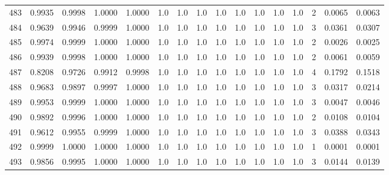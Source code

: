 \begin{tabular}{lrrrrrrrrrrrrrrr}
483 &      0.9935 &  0.9998 &  1.0000 &  1.0000 &     1.0 &     1.0 &     1.0 &     1.0 &     1.0 &     1.0 &      1.0 &        1.0 &      2 &                    0.0065 &                     0.0063 \\
484 &      0.9639 &  0.9946 &  0.9999 &  1.0000 &     1.0 &     1.0 &     1.0 &     1.0 &     1.0 &     1.0 &      1.0 &        1.0 &      3 &                    0.0361 &                     0.0307 \\
485 &      0.9974 &  0.9999 &  1.0000 &  1.0000 &     1.0 &     1.0 &     1.0 &     1.0 &     1.0 &     1.0 &      1.0 &        1.0 &      2 &                    0.0026 &                     0.0025 \\
486 &      0.9939 &  0.9998 &  1.0000 &  1.0000 &     1.0 &     1.0 &     1.0 &     1.0 &     1.0 &     1.0 &      1.0 &        1.0 &      2 &                    0.0061 &                     0.0059 \\
487 &      0.8208 &  0.9726 &  0.9912 &  0.9998 &     1.0 &     1.0 &     1.0 &     1.0 &     1.0 &     1.0 &      1.0 &        1.0 &      4 &                    0.1792 &                     0.1518 \\
488 &      0.9683 &  0.9897 &  0.9997 &  1.0000 &     1.0 &     1.0 &     1.0 &     1.0 &     1.0 &     1.0 &      1.0 &        1.0 &      3 &                    0.0317 &                     0.0214 \\
489 &      0.9953 &  0.9999 &  1.0000 &  1.0000 &     1.0 &     1.0 &     1.0 &     1.0 &     1.0 &     1.0 &      1.0 &        1.0 &      3 &                    0.0047 &                     0.0046 \\
490 &      0.9892 &  0.9996 &  1.0000 &  1.0000 &     1.0 &     1.0 &     1.0 &     1.0 &     1.0 &     1.0 &      1.0 &        1.0 &      2 &                    0.0108 &                     0.0104 \\
491 &      0.9612 &  0.9955 &  0.9999 &  1.0000 &     1.0 &     1.0 &     1.0 &     1.0 &     1.0 &     1.0 &      1.0 &        1.0 &      3 &                    0.0388 &                     0.0343 \\
492 &      0.9999 &  1.0000 &  1.0000 &  1.0000 &     1.0 &     1.0 &     1.0 &     1.0 &     1.0 &     1.0 &      1.0 &        1.0 &      1 &                    0.0001 &                     0.0001 \\
493 &      0.9856 &  0.9995 &  1.0000 &  1.0000 &     1.0 &     1.0 &     1.0 &     1.0 &     1.0 &     1.0 &      1.0 &        1.0 &      3 &                    0.0144 &                     0.0139 \\

\end{tabular}
